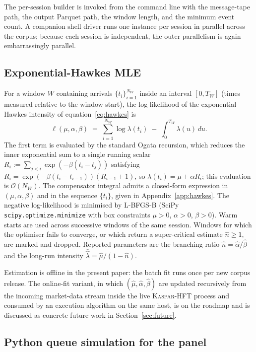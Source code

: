 \documentclass[11pt]{article}
\newcommand{\kasparhft}{\textsc{Kaspar-HFT}}
\begin{document}
The per-session builder is invoked from the command line with the message-tape path, the output Parquet path, the window length, and the minimum event count. A companion shell driver runs one instance per session in parallel across the corpus; because each session is independent, the outer parallelism is again embarrassingly parallel.

\subsection{Exponential-Hawkes MLE}
\label{sec:pipeline-hawkes}

For a window $W$ containing arrivals $\{t_i\}_{i=1}^{N_W}$ inside an interval $[0, T_W]$ (times measured relative to the window start), the log-likelihood of the exponential-Hawkes intensity of equation~\eqref{eq:hawkes} is
\[
\ell(\mu, \alpha, \beta) \;=\; \sum_{i=1}^{N_W} \log \lambda(t_i) \;-\; \int_0^{T_W} \lambda(u)\, du.
\]
The first term is evaluated by the standard Ogata recursion, which reduces the inner exponential sum to a single running scalar $R_i := \sum_{j < i} \exp(-\beta(t_i - t_j))$ satisfying $R_i = \exp(-\beta(t_i - t_{i-1}))(R_{i-1} + 1)$, so $\lambda(t_i) = \mu + \alpha R_i$; this evaluation is $\mathcal{O}(N_W)$. The compensator integral admits a closed-form expression in $(\mu, \alpha, \beta)$ and in the sequence $\{t_i\}$, given in Appendix~\ref{app:hawkes}. The negative log-likelihood is minimised by L-BFGS-B (SciPy \texttt{scipy.optimize.minimize} with box constraints $\mu > 0$, $\alpha > 0$, $\beta > 0$). Warm starts are used across successive windows of the same session. Windows for which the optimiser fails to converge, or which return a super-critical estimate $\hat n \geq 1$, are marked and dropped. Reported parameters are the branching ratio $\hat n = \hat\alpha / \hat\beta$ and the long-run intensity $\bar{\hat\lambda} = \hat\mu / (1 - \hat n)$.

Estimation is offline in the present paper: the batch fit runs once per new corpus release. The online-fit variant, in which $(\hat\mu, \hat\alpha, \hat\beta)$ are updated recursively from the incoming market-data stream inside the live \kasparhft{} process and consumed by an execution algorithm on the same host, is on the roadmap and is discussed as concrete future work in Section~\ref{sec:future}.

\subsection{Python queue simulation for the panel}
\label{sec:pipeline-qsim}
\end{document}
